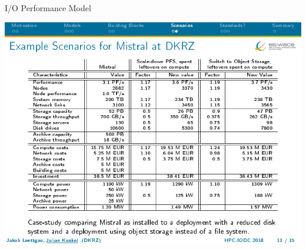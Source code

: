 \documentclass[compress,11pt,xcolor=svgnames,aspectratio=169]{beamer}
\begin{document}
\begin{frame}[fragile]{I/O Performance Model}

\nocite{CAPMFESDMA19}

\begin{center}
\includegraphics[scale=0.7]{fig/bottleneck4}
\end{center}

\end{frame}
\end{document}
